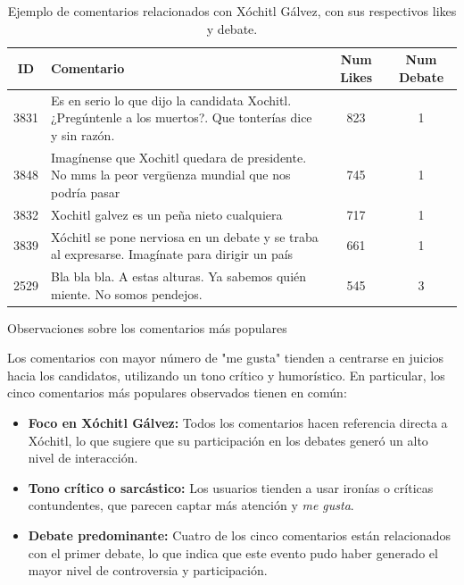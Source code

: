 \documentclass[10pt, a4paper]{article}
\begin{document}
	\begin{table}[H]
		\centering
		\begin{tabular}{|c|p{11cm}|c|c|}
			\hline
			\textbf{ID} & \textbf{Comentario} & \textbf{Num Likes} & \textbf{Num Debate} \\ \hline
			3831 & Es en serio lo que dijo la candidata Xochitl. ¿Pregúntenle a los muertos?. Que tonterías dice y sin razón. & 823 & 1 \\ \hline
			3848 & Imagínense que Xochitl quedara de presidente. No mms la peor vergüenza mundial que nos podría pasar & 745 & 1 \\ \hline
			3832 & Xochitl galvez es un peña nieto cualquiera & 717 & 1 \\ \hline
			3839 & Xóchitl se pone nerviosa en un debate y se traba al expresarse. Imagínate para dirigir un país & 661 & 1 \\ \hline
			2529 & Bla bla bla. A estas alturas. Ya sabemos quién miente. No somos pendejos. & 545 & 3 \\ \hline
		\end{tabular}
		\caption{Ejemplo de comentarios relacionados con Xóchitl Gálvez, con sus respectivos likes y debate.}
		\label{tab:comentarios_xochitl}
	\end{table}
	
	Observaciones sobre los comentarios más populares
	
	Los comentarios con mayor número de "me gusta" tienden a centrarse en juicios hacia los candidatos, utilizando un tono crítico y humorístico. En particular, los cinco comentarios más populares observados tienen en común:
	
	\begin{itemize}
		\item \textbf{Foco en Xóchitl Gálvez:} Todos los comentarios hacen referencia directa a Xóchitl, lo que sugiere que su participación en los debates generó un alto nivel de interacción.
		\item \textbf{Tono crítico o sarcástico:} Los usuarios tienden a usar ironías o críticas contundentes, que parecen captar más atención y \textit{me gusta}.
		\item \textbf{Debate predominante:} Cuatro de los cinco comentarios están relacionados con el primer debate, lo que indica que este evento pudo haber generado el mayor nivel de controversia y participación.
	\end{itemize}
	
	
\end{document}
